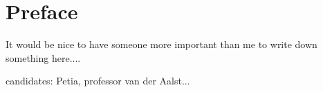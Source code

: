 


\chapter*{Preface}

It would be nice to have someone more important than me to write down something here....

candidates: Petia, professor van der Aalst...

